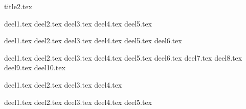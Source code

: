 \documentclass[a4paper,11pt]{article}
\begin{document}


{title2.tex}

\clearpage

\thispagestyle{empty}

\tableofcontents

\clearpage


\setcounter{section}{3}
\newpage
{deel1.tex}
{deel2.tex}
{deel3.tex}
{deel4.tex}
{deel5.tex}


\newpage
{deel1.tex}
{deel2.tex}
{deel3.tex}
{deel4.tex}
{deel5.tex}
{deel6.tex}





\newpage
{deel1.tex}
{deel2.tex}
{deel3.tex}
{deel4.tex}
{deel5.tex}
{deel6.tex}
{deel7.tex}
{deel8.tex}
{deel9.tex}
{deel10.tex}




\newpage
{deel1.tex}
{deel2.tex}
{deel3.tex}
{deel4.tex}






\newpage
{deel1.tex}
{deel2.tex}
{deel3.tex}
{deel4.tex}
{deel5.tex}
\end{document}
